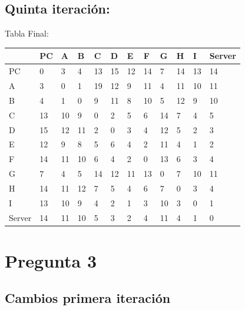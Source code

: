 \documentclass[a4paper]{article}
\begin{document}
\clearpage


\subsection{Quinta iteración:}

Tabla Final:\\

\begin{table}[ht]
\begin{tabular}{|l|l|l|l|l|l|l|l|l|l|l|l|}
\hline
       & PC & A  & B  & C  & D  & E  & F  & G  & H  & I  & Server \\ \hline
PC     & 0  & 3  & 4  & 13 & 15 & 12 & 14 & 7  & 14 & 13 & 14     \\ \hline
A      & 3  & 0  & 1  & 19 & 12 & 9  & 11 & 4  & 11 & 10 & 11     \\ \hline
B      & 4  & 1  & 0  & 9  & 11 & 8  & 10 & 5  & 12 & 9  & 10     \\ \hline
C      & 13 & 10 & 9  & 0  & 2  & 5  & 6  & 14 & 7  & 4  & 5      \\ \hline
D      & 15 & 12 & 11 & 2  & 0  & 3  & 4  & 12 & 5  & 2  & 3      \\ \hline
E      & 12 & 9  & 8  & 5  & 6  & 4  & 2  & 11 & 4  & 1  & 2      \\ \hline
F      & 14 & 11 & 10 & 6  & 4  & 2  & 0  & 13 & 6  & 3  & 4      \\ \hline
G      & 7  & 4  & 5  & 14 & 12 & 11 & 13 & 0  & 7  & 10 & 11     \\ \hline
H      & 14 & 11 & 12 & 7  & 5  & 4  & 6  & 7  & 0  & 3  & 4      \\ \hline
I      & 13 & 10 & 9  & 4  & 2  & 1  & 3  & 10 & 3  & 0  & 1      \\ \hline
Server & 14 & 11 & 10 & 5  & 3  & 2  & 4  & 11 & 4  & 1  & 0      \\ \hline
\end{tabular}
\end{table}

\section{Pregunta 3}

\subsection{Cambios primera iteración}
\end{document}
